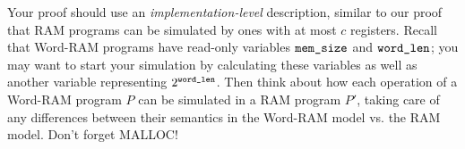 \documentclass[11pt]{article}
\begin{document}
\begin{enumerate}
Your proof should use an {\em implementation-level} description, similar to our proof that RAM programs can be simulated by ones with at most $c$ registers.  Recall that Word-RAM programs have read-only variables $\texttt{mem\_size}$ and $\texttt{word\_len}$; you may want to start your simulation by calculating these variables as well as another variable representing $2^{\texttt{word\_len}}$.  Then think about how each operation of a Word-RAM program $P$ can be simulated in a RAM program $P'$, taking care of any differences between their semantics in the Word-RAM model vs. the RAM model. Don't forget MALLOC!

\end{enumerate}
\end{document}
